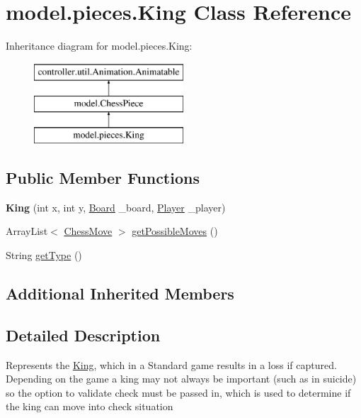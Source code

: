 \hypertarget{classmodel_1_1pieces_1_1_king}{\section{model.\-pieces.\-King Class Reference}
\label{classmodel_1_1pieces_1_1_king}
}
Inheritance diagram for model.\-pieces.\-King\-:\begin{figure}[H]
\begin{center}
\leavevmode
\includegraphics[height=3.000000cm]{classmodel_1_1pieces_1_1_king}
\end{center}
\end{figure}
\subsection*{Public Member Functions}
\begin{DoxyCompactItemize}
\item 
\hypertarget{classmodel_1_1pieces_1_1_king_ab589bb5242906a1fe6f2ccf6db49ff06}{{\bfseries King} (int x, int y, \hyperlink{classmodel_1_1board_1_1_board}{Board} \-\_\-board, \hyperlink{classcontroller_1_1_player}{Player} \-\_\-player)}\label{classmodel_1_1pieces_1_1_king_ab589bb5242906a1fe6f2ccf6db49ff06}

\item 
Array\-List$<$ \hyperlink{classmodel_1_1_chess_move}{Chess\-Move} $>$ \hyperlink{classmodel_1_1pieces_1_1_king_a01079269fe18d60396f980ea099ae7cc}{get\-Possible\-Moves} ()
\item 
String \hyperlink{classmodel_1_1pieces_1_1_king_aae0c46ac679ce113aa2c5bf64997f618}{get\-Type} ()
\end{DoxyCompactItemize}
\subsection*{Additional Inherited Members}


\subsection{Detailed Description}
Represents the \hyperlink{classmodel_1_1pieces_1_1_king}{King}, which in a Standard game results in a loss if captured. Depending on the game a king may not always be important (such as in suicide) so the option to validate check must be passed in, which is used to determine if the king can move into check situation

